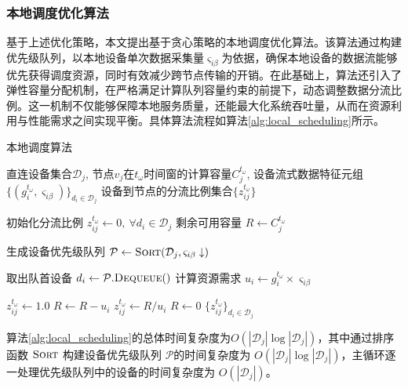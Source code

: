 \subsubsection{本地调度优化算法}

基于上述优化策略，本文提出基于贪心策略的本地调度优化算法。该算法通过构建优先级队列，以本地设备单次数据采集量$\varsigma_{i\beta}$为依据，确保本地设备的数据流能够优先获得调度资源，同时有效减少跨节点传输的开销。在此基础上，算法还引入了弹性容量分配机制，在严格满足计算队列容量约束的前提下，动态调整数据分流比例。这一机制不仅能够保障本地服务质量，还能最大化系统吞吐量，从而在资源利用与性能需求之间实现平衡。具体算法流程如算法\ref{alg:local_scheduling}所示。

\begin{algorithm}[ht]
\caption{本地调度算法}
\label{alg:local_scheduling}
\begin{algorithmic}[1]
\REQUIRE  
  直连设备集合$\mathcal{D}_j$,  节点$v_j$在$t_\omega$时间窗的计算容量$C^{t_\omega}_j$, 设备流式数据特征元组$\{(g_i^{t_\omega}, \varsigma_{i\beta})\}_{d_i \in \mathcal{D}_j}$
\ENSURE  
  设备到节点的分流比例集合$\{z_{ij}^{t_\omega}\}$

\STATE 初始化分流比例 $z_{ij}^{t_\omega} \leftarrow 0,\ \forall d_i \in \mathcal{D}_j$  
\STATE 剩余可用容量 $R \leftarrow C_j^{t_\omega}$  

\STATE 生成设备优先级队列 $\mathcal{P} \leftarrow \textsc{Sort}(\mathcal{D}_j, \varsigma_{i\beta} \downarrow)$  

  \STATE 取出队首设备 $d_i \leftarrow \mathcal{P}.\textsc{Dequeue}()$
  \STATE 计算资源需求 $u_i \leftarrow g_i^{t_\omega} \times \varsigma_{i\beta}$ 
  
    \STATE $z_{ij}^{t_\omega} \leftarrow 1.0$ 
    \STATE $R \leftarrow R - u_i$ 
  \ELSE
    \STATE $z_{ij}^{t_\omega} \leftarrow R / u_i$ 
    \STATE $R \leftarrow 0$ 
  \ENDIF
\ENDWHILE
\RETURN $\{z_{ij}^{t_\omega}\}_{d_i \in \mathcal{D}_j}$
\end{algorithmic}
\end{algorithm}

算法\ref{alg:local_scheduling}的总体时间复杂度为$O(|\mathcal{D}_j| \log |\mathcal{D}_j|)$，其中通过排序函数 $\textsc{Sort}$ 构建设备优先级队列 $\mathcal{P}$的时间复杂度为 $O(|\mathcal{D}_j| \log |\mathcal{D}_j|)$，主循环逐一处理优先级队列中的设备的时间复杂度为 $O(|\mathcal{D}_j|)$。


